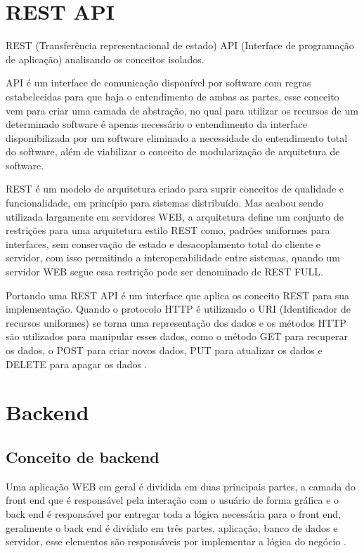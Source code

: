 \documentclass[../../layout.tex]{subfiles}
\begin{document}
\section{REST API}
\hspace*{3em}REST (Transferência representacional de estado) API (Interface de programação de aplicação) analisando os conceitos isolados.\par
API é um interface de comunicação  disponível por software com regras estabelecidas para que haja o entendimento de ambas as partes, esse conceito vem para criar uma camada de abstração, no qual para utilizar os recursos de um determinado software é apenas necessário o entendimento da interface  disponibilizada por um software eliminado a  necessidade do entendimento total do software, além de viabilizar o conceito de modularização  de arquitetura de software.\par \cite{16}
REST é um modelo de arquitetura criado para suprir conceitos de qualidade e funcionalidade, em princípio para sistemas distribuído. Mas acabou sendo utilizada largamente em servidores WEB, a arquitetura define um conjunto de restrições para uma arquitetura estilo REST como, padrões uniformes para interfaces, sem conservação de estado e desacoplamento total do cliente e servidor, com isso permitindo a interoperabilidade entre sistemas, quando um servidor WEB segue essa restrição pode ser denominado de REST FULL.\par
Portando uma REST API é um interface que aplica os conceito REST para sua implementação\cite{19}. Quando o protocolo HTTP é utilizando o URI (Identificador de recursos uniformes) se torna uma representação dos dados e os métodos HTTP são utilizados para manipular esses dados, como o método GET para recuperar os dados, o POST para criar novos dados, PUT para atualizar os dados e DELETE para apagar os dados \cite{16}.

\section{Backend}

\subsection{Conceito de backend}
\hspace*{3em}Uma aplicação WEB em geral é dividida  em duas principais partes, a camada do front end que é responsável pela interação com o usuário de forma gráfica e o back end é responsável por entregar toda a lógica necessária para o front end, geralmente o back end é dividido em três partes, aplicação, banco de dados  e servidor, esse elementos são responsáveis por implementar a lógica do negócio \cite{16}.
\end{document}
